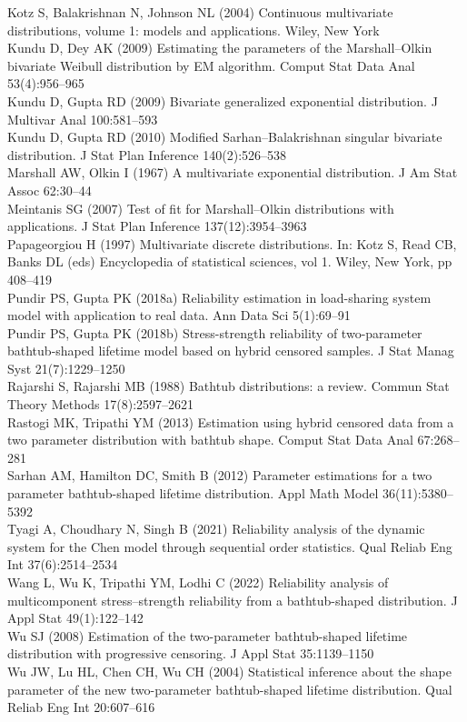 \documentclass[11pt,a4paper]{article}
\begin{document}
{\noindent Kotz S, Balakrishnan N, Johnson NL (2004) Continuous multivariate distributions, volume 1: models and applications. Wiley, New York\\[0.35em]
\noindent Kundu D, Dey AK (2009) Estimating the parameters of the Marshall--Olkin bivariate Weibull distribution by EM algorithm. Comput Stat Data Anal 53(4):956--965\\[0.35em]
\noindent Kundu D, Gupta RD (2009) Bivariate generalized exponential distribution. J Multivar Anal 100:581--593\\[0.35em]
\noindent Kundu D, Gupta RD (2010) Modified Sarhan--Balakrishnan singular bivariate distribution. J Stat Plan Inference 140(2):526--538\\[0.35em]
\noindent Marshall AW, Olkin I (1967) A multivariate exponential distribution. J Am Stat Assoc 62:30--44\\[0.35em]
\noindent Meintanis SG (2007) Test of fit for Marshall--Olkin distributions with applications. J Stat Plan Inference 137(12):3954--3963\\[0.35em]
\noindent Papageorgiou H (1997) Multivariate discrete distributions. In: Kotz S, Read CB, Banks DL (eds) Encyclopedia of statistical sciences, vol 1. Wiley, New York, pp 408--419\\[0.35em]
\noindent Pundir PS, Gupta PK (2018a) Reliability estimation in load-sharing system model with application to real data. Ann Data Sci 5(1):69--91\\[0.35em]
\noindent Pundir PS, Gupta PK (2018b) Stress-strength reliability of two-parameter bathtub-shaped lifetime model based on hybrid censored samples. J Stat Manag Syst 21(7):1229--1250\\[0.35em]
\noindent Rajarshi S, Rajarshi MB (1988) Bathtub distributions: a review. Commun Stat Theory Methods 17(8):2597--2621\\[0.35em]
\noindent Rastogi MK, Tripathi YM (2013) Estimation using hybrid censored data from a two parameter distribution with bathtub shape. Comput Stat Data Anal 67:268--281\\[0.35em]
\noindent Sarhan AM, Hamilton DC, Smith B (2012) Parameter estimations for a two parameter bathtub-shaped lifetime distribution. Appl Math Model 36(11):5380--5392\\[0.35em]
\noindent Tyagi A, Choudhary N, Singh B (2021) Reliability analysis of the dynamic system for the Chen model through sequential order statistics. Qual Reliab Eng Int 37(6):2514--2534\\[0.35em]
\noindent Wang L, Wu K, Tripathi YM, Lodhi C (2022) Reliability analysis of multicomponent stress--strength reliability from a bathtub-shaped distribution. J Appl Stat 49(1):122--142\\[0.35em]
\noindent Wu SJ (2008) Estimation of the two-parameter bathtub-shaped lifetime distribution with progressive censoring. J Appl Stat 35:1139--1150\\[0.35em]
\noindent Wu JW, Lu HL, Chen CH, Wu CH (2004) Statistical inference about the shape parameter of the new two-parameter bathtub-shaped lifetime distribution. Qual Reliab Eng Int 20:607--616
}
\end{document}
